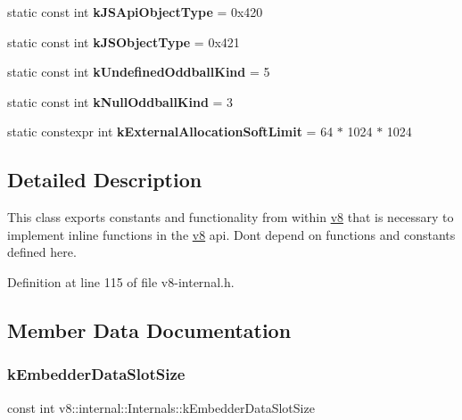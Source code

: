 \begin{DoxyCompactItemize}
static const int {\bfseries k\+J\+S\+Api\+Object\+Type} = 0x420
\item 
\mbox{\label{classv8_1_1internal_1_1Internals_a56b7062df5d9a7df491137d4c3341bcc}} 
static const int {\bfseries k\+J\+S\+Object\+Type} = 0x421
\item 
\mbox{\label{classv8_1_1internal_1_1Internals_a39072b9e0ffea4031f4a1c514208b20d}} 
static const int {\bfseries k\+Undefined\+Oddball\+Kind} = 5
\item 
\mbox{\label{classv8_1_1internal_1_1Internals_a72243c5512cb5cab9d10b6f29e775180}} 
static const int {\bfseries k\+Null\+Oddball\+Kind} = 3
\item 
\mbox{\label{classv8_1_1internal_1_1Internals_af85a33cd47a2c9ed5faa4e1a85a6afce}} 
static constexpr int {\bfseries k\+External\+Allocation\+Soft\+Limit} = 64 $\ast$ 1024 $\ast$ 1024
\end{DoxyCompactItemize}


\subsection{Detailed Description}
This class exports constants and functionality from within \mbox{\hyperlink{namespacev8}{v8}} that is necessary to implement inline functions in the \mbox{\hyperlink{namespacev8}{v8}} api. Don\textquotesingle{}t depend on functions and constants defined here. 

Definition at line 115 of file v8-\/internal.\+h.



\subsection{Member Data Documentation}
\mbox{\label{classv8_1_1internal_1_1Internals_a0947f712baffcb6772bd5e2ac5a47e1d}} 
\subsubsection{\texorpdfstring{k\+Embedder\+Data\+Slot\+Size}{kEmbedderDataSlotSize}}
{\footnotesize\ttfamily const int v8\+::internal\+::\+Internals\+::k\+Embedder\+Data\+Slot\+Size\hspace{0.3cm}{\ttfamily [static]}}

